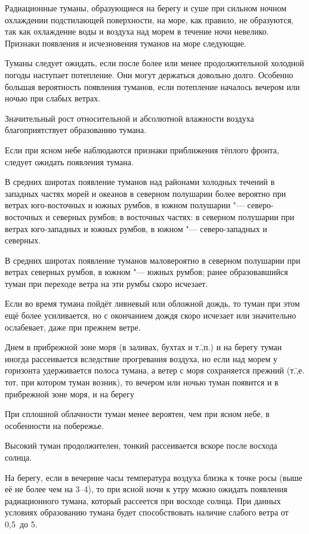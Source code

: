 Радиационные туманы, образующиеся на берегу и суше при сильном ночном
охлаждении подстилающей поверхности, на море, как правило, не
образуются, так как охлаждение воды и воздуха над морем в течение ночи
невелико. Признаки появления и исчезновения туманов на море следующие.

 Туманы следует ожидать, если после более или менее
продолжительной холодной погоды наступает потепление. Они могут
держаться довольно долго. Особенно большая вероятность появления
туманов, если потепление началось вечером или ночью при слабых ветрах.

 Значительный рост относительной и абсолютной влажности воздуха
благоприятствует образованию тумана.

 Если при ясном небе наблюдаются признаки приближения тёплого
фронта, следует ожидать появления тумана.

 В средних широтах появление туманов над районами холодных течений
в западных частях морей и океанов в северном полушарии более вероятно
при ветрах юго-восточных и южных румбов, в южном
полушарии "--- северо-восточных и северных румбов; в восточных частях: в
северном полушарии при ветрах юго-западных и южных румбов, в южном "---
северо-западных и северных.

 В средних широтах появление туманов маловероятно в северном
полушарии при ветрах северных румбов, в южном "--- южных румбов; ранее
образовавшийся туман при переходе ветра на эти румбы скоро исчезает.

 Если во время тумана пойдёт ливневый или обложной дождь, то туман
при этом ещё более усиливается, но с окончанием дождя скоро исчезает
или значительно ослабевает, даже при прежнем ветре.

 Днем в прибрежной зоне моря (в заливах, бухтах и т.\=,п.) и на
берегу туман иногда рассеивается вследствие прогревания воздуха, но
если над морем у горизонта удерживается полоса тумана, а ветер с моря
сохраняется прежний (т.\=,е. тот, при котором туман возник), то
вечером или ночью туман появится и в прибрежной зоне моря, и на берегу

 При сплошной облачности туман менее вероятен, чем при ясном
небе, в особенности на побережье.

 Высокий туман продолжителен, тонкий рассеивается вскоре после
восхода солнца.

 На берегу, если в вечерние часы температура воздуха близка к
точке росы (выше её не более чем на 3--4\grC), то при ясной ночи к утру
можно ожидать появления радиационного тумана, который рассеется при
восходе солнца. При данных условиях образованию тумана будет
способствовать наличие слабого ветра от 0,5~до 5\speedms.

